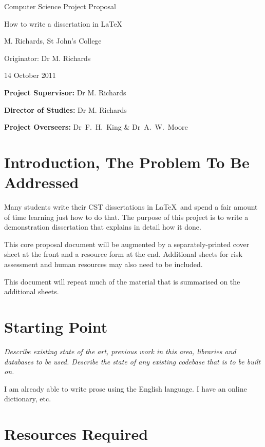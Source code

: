 \documentclass[12pt,a4paper,twoside]{article}
\begin{document}
\vfil

\centerline{\Large Computer Science Project Proposal}
\vspace{0.4in}
\centerline{\Large How to write a dissertation in \LaTeX}
\vspace{0.4in}
\centerline{\large M. Richards, St John's College}
\vspace{0.3in}
\centerline{\large Originator: Dr M. Richards}
\vspace{0.3in}
\centerline{\large 14 October 2011}

\vfil


\noindent
{\bf Project Supervisor:} Dr M. Richards
\vspace{0.2in}

\noindent
{\bf Director of Studies:} Dr M. Richards
\vspace{0.2in}
\noindent
 
\noindent
{\bf Project Overseers:} Dr~F.~H.~King  \& Dr~A.~W.~Moore



\section*{Introduction, The Problem To Be Addressed}


Many students write their CST dissertations in \LaTeX\ and spend a
fair amount of time learning just how to do that. The purpose of this
project is to write a demonstration dissertation that explains in
detail how it done.

This core proposal document will be augmented by a separately-printed
cover sheet at the front and a resource form at the end. Additional
sheets for risk assessment and human resources may also need to be
included.

This document will repeat much of the material that is summarised on
the additional sheets.

\section*{Starting Point}

{\em Describe existing state of the art, previous work in this area,
  libraries and databases to be used. Describe the state of any
  existing codebase that is to be built on. }

I am already able to write prose using the English language. I have an
online dictionary, etc.

\section*{Resources Required}
\end{document}
